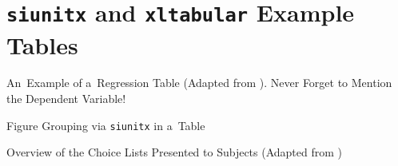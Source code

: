 



\section{\texttt{siunitx} and \texttt{xltabular} Example Tables}
\label{sec:app:example_tables}

\begin{table}[h!]
	\caption{An~Example of a~Regression Table (Adapted from \citealp{Gerhardt2017}). Never Forget to Mention the Dependent Variable!}
	\label{tab:lin_reg_interactions}
	
\end{table}

\begin{table}[h!]
	\caption{Figure Grouping via \texttt{siunitx} in a~Table}
	
\end{table}

\newcommand{\mc}[2]{\multicolumn{1}{@{} c #2}{#1}}

\begin{table}[p]
	\caption{Overview of the Choice Lists Presented to Subjects (Adapted from \citealp{Gerhardt2017})}
	\label{tab:choice_lists}%
	
\end{table}%

\newpage


